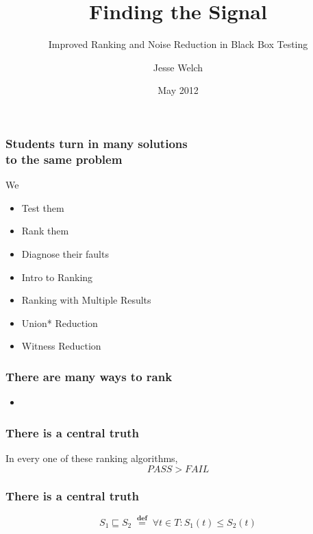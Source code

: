 \documentclass[svgnames,14pt]{beamer}
\title{Finding the Signal}
\subtitle{Improved Ranking and Noise Reduction in Black Box Testing}
\author{Jesse Welch}
\date{May 2012}
\newcommand\fail{\mathit{FAIL}}
\newcommand\pass{\mathit{PASS}}
\newcommand\defined{\mathrel{\;\stackrel{\scriptscriptstyle\mathbf{def}}{=}\;}}
\theoremstyle{definition}
\begin{document}
\begin{frame}
\maketitle
\end{frame}


\begin{frame}
\frametitle{Students turn in many solutions \\ to the same problem}
We 
\begin{itemize}
\item Test them \only<2->{\textbf{cheaply}}
\item Rank them 
\item Diagnose their faults 
\end{itemize}
\end{frame}

\begin{frame}
\begin{itemize}
\frametitle{Overview}
\item<1-2> Intro to Ranking
\item<1> Ranking with Multiple Results
\item<1> Union* Reduction
\item<1> Witness Reduction
\end{itemize}
\end{frame}

\begin{frame}
\frametitle{There are many ways to rank}
\begin{itemize}
\item {}
\end{itemize}
\end{frame}

\begin{frame}
\frametitle{There is a central truth}
In every one of these ranking algorithms,
$$\pass>\fail$$
\end{frame}

\begin{frame}
\frametitle{There is a central truth}
\begin{block}{}
$$S_1 \sqsubseteq S_2 \defined \forall t \in T : S_1(t) \leq S_2(t)$$
\end{block}
\end{frame}
\end{document}
